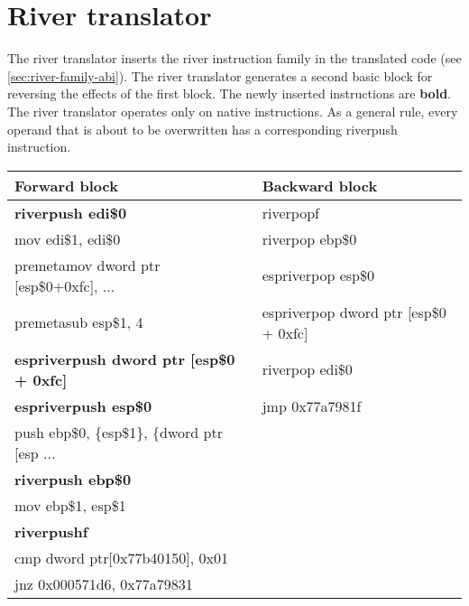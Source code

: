 \documentclass[12pt]{report}
\begin{document}
\section{River translator}
\label{sec:river-translator}
The river translator inserts the river instruction family in the translated code (see \autoref{sec:river-family-abi}). The river translator generates a second basic block for reversing the effects of the first block. The newly inserted instructions are \textbf{bold}. The river translator operates only on native instructions. As a general rule, every operand that is about to be overwritten has a corresponding riverpush instruction.\\
\newline
\begin{tabular}{| l | l |}
	\hline
	\textbf{Forward block} & \textbf{Backward block}\\ \hline
	\textbf{riverpush edi\$0} & riverpopf\\
	mov edi\$1, edi\$0 & riverpop ebp\$0\\
	premetamov dword ptr [esp\$0+0xfc], ... & espriverpop esp\$0\\
	premetasub esp\$1, 4 & espriverpop dword ptr [esp\$0 + 0xfc]\\
	\textbf{espriverpush dword ptr [esp\$0 + 0xfc]} & riverpop edi\$0\\
	\textbf{espriverpush esp\$0} & jmp 0x77a7981f\\
	push ebp\$0, \{esp\$1\}, \{dword ptr [esp ... & \\
	\textbf{riverpush ebp\$0} & \\
	mov ebp\$1, esp\$1 & \\
	\textbf{riverpushf} & \\
	cmp dword ptr[0x77b40150], 0x01 & \\
	jnz 0x000571d6, 0x77a79831 & \\ \hline
\end{tabular}
\end{document}
